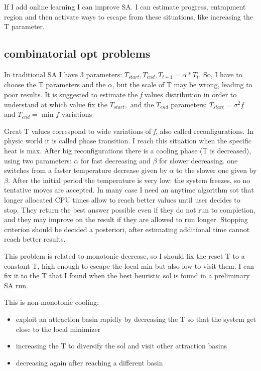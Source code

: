 \documentclass[11pt]{article}
\begin{document}
If I add online learning I can improve SA. I can estimate progress, entrapment region and then activate ways to escape from these situations, like increasing the T parameter.

\subsection{combinatorial opt problems}
In traditional SA I have 3 parameters: $ T_{start}, T_{end}, T_{t+1} = \alpha * T_t $. So, I have to choose the T parameters and the $ \alpha $, but the scale of T may be wrong, leading to poor results. It is suggested to estimate the \textit{f} values distribution in order to understand at which value fix the $ T_{start}, \text{ and the } T_{end} $ parameters: $ T_{start} = \sigma^2 f $ and $ T_{end} = \text{ min } f \text{ variations} $

Great T values correspond to wide variations of \textit{f}, also called reconfigurations. In physic world it is called phase transition. I reach this situation when the specific heat is max. After big reconfigurations there is a cooling phase (T is decreased), using two parameters: $ \alpha $ for fast decreasing and $ \beta $ for slower decreasing. one switches from a faster temperature decrease given by $ \alpha $ to the slower one given by $ \beta $.
After the initial period the temperature is very low: the system freezes, so no tentative moves are accepted. In many case I need an anytime algorithm sot that longer allocated CPU times allow to reach better values until user decides to stop. They return the best answer possible even if they do not run to completion, and they may improve on the result if they are allowed to run longer. Stopping criterion should be decided a posteriori, after estimating additional time cannot reach better results. 

This problem is related to monotonic decrease, so I should fix the reset T to a constant T, high enough to escape the local min but also low to visit them. I can fix it to the T that I found when the best heuristic sol is found in a preliminary SA run. 

This is non-monotonic cooling:

\begin{itemize}
\item exploit an attraction basin rapidly
by decreasing the T so that the system get close to the local minimizer
\item increasing the
T to diversify the sol and visit other attraction basins
\item decreasing again after reaching a different
basin
\end{itemize}
\end{document}
